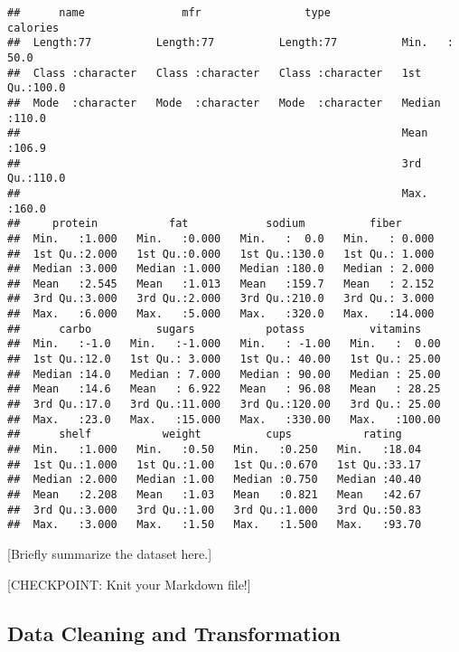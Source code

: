 \documentclass[]{article}
\begin{document}
\begin{verbatim}
##      name               mfr                type              calories    
##  Length:77          Length:77          Length:77          Min.   : 50.0  
##  Class :character   Class :character   Class :character   1st Qu.:100.0  
##  Mode  :character   Mode  :character   Mode  :character   Median :110.0  
##                                                           Mean   :106.9  
##                                                           3rd Qu.:110.0  
##                                                           Max.   :160.0  
##     protein           fat            sodium          fiber       
##  Min.   :1.000   Min.   :0.000   Min.   :  0.0   Min.   : 0.000  
##  1st Qu.:2.000   1st Qu.:0.000   1st Qu.:130.0   1st Qu.: 1.000  
##  Median :3.000   Median :1.000   Median :180.0   Median : 2.000  
##  Mean   :2.545   Mean   :1.013   Mean   :159.7   Mean   : 2.152  
##  3rd Qu.:3.000   3rd Qu.:2.000   3rd Qu.:210.0   3rd Qu.: 3.000  
##  Max.   :6.000   Max.   :5.000   Max.   :320.0   Max.   :14.000  
##      carbo          sugars           potass          vitamins     
##  Min.   :-1.0   Min.   :-1.000   Min.   : -1.00   Min.   :  0.00  
##  1st Qu.:12.0   1st Qu.: 3.000   1st Qu.: 40.00   1st Qu.: 25.00  
##  Median :14.0   Median : 7.000   Median : 90.00   Median : 25.00  
##  Mean   :14.6   Mean   : 6.922   Mean   : 96.08   Mean   : 28.25  
##  3rd Qu.:17.0   3rd Qu.:11.000   3rd Qu.:120.00   3rd Qu.: 25.00  
##  Max.   :23.0   Max.   :15.000   Max.   :330.00   Max.   :100.00  
##      shelf           weight          cups           rating     
##  Min.   :1.000   Min.   :0.50   Min.   :0.250   Min.   :18.04  
##  1st Qu.:1.000   1st Qu.:1.00   1st Qu.:0.670   1st Qu.:33.17  
##  Median :2.000   Median :1.00   Median :0.750   Median :40.40  
##  Mean   :2.208   Mean   :1.03   Mean   :0.821   Mean   :42.67  
##  3rd Qu.:3.000   3rd Qu.:1.00   3rd Qu.:1.000   3rd Qu.:50.83  
##  Max.   :3.000   Max.   :1.50   Max.   :1.500   Max.   :93.70
\end{verbatim}

{[}Briefly summarize the dataset here.{]}

{[}CHECKPOINT: Knit your Markdown file!{]}

\hypertarget{data-cleaning-and-transformation}{%
\subsection{Data Cleaning and
Transformation}\label{data-cleaning-and-transformation}}
\end{document}
